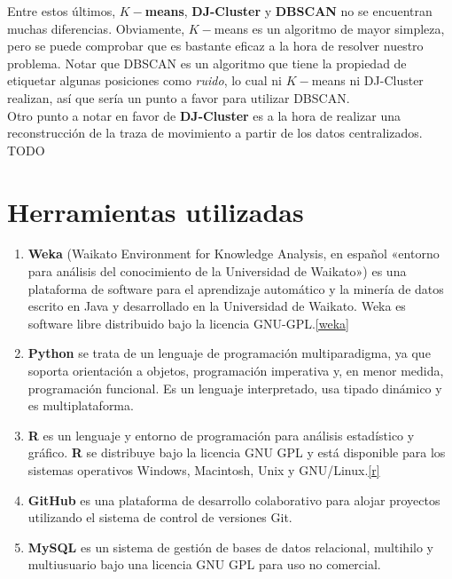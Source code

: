 \documentclass[a4paper, 12pt]{article}
\begin{document}
Entre estos \'ultimos, \textbf{$K-$means}, \textbf{DJ-Cluster} y \textbf{DBSCAN} no se encuentran muchas diferencias. Obviamente, $K-$means es un algoritmo de mayor simpleza, pero se puede comprobar que es bastante eficaz a la hora de resolver nuestro problema. Notar que DBSCAN es un algoritmo que tiene la propiedad de etiquetar algunas posiciones como \textit{ruido}, lo cual ni $K-$means ni DJ-Cluster realizan, as\'i que ser\'ia un punto a favor para utilizar DBSCAN.\\

Otro punto a notar en favor de \textbf{DJ-Cluster} es a la hora de realizar una reconstrucci\'on de la traza de movimiento a partir de los datos centralizados. TODO


\pagebreak
\section{Herramientas utilizadas}

\begin{enumerate}
	\item \textbf{Weka} (Waikato Environment for Knowledge Analysis, en espa\~nol «entorno para an\'alisis del conocimiento de la Universidad de Waikato») es una plataforma de software para el aprendizaje autom\'atico y la miner\'ia de datos escrito en Java y desarrollado en la Universidad de Waikato. Weka es software libre distribuido bajo la licencia GNU-GPL.\ref{weka}
	
	\item \textbf{Python} se trata de un lenguaje de programaci\'on multiparadigma, ya que soporta orientaci\'on a objetos, programaci\'on imperativa y, en menor medida, programaci\'on funcional. Es un lenguaje interpretado, usa tipado dinámico y es multiplataforma.
	
	\item \textbf{R} es un lenguaje y entorno de programaci\'on para an\'alisis estad\'istico y gr\'afico. \textbf{R} se distribuye bajo la licencia GNU GPL y est\'a disponible para los sistemas operativos Windows, Macintosh, Unix y GNU/Linux.\ref{r}
	
	\item \textbf{GitHub} es una plataforma de desarrollo colaborativo para alojar proyectos utilizando el sistema de control de versiones Git.
	
	\item \textbf{MySQL} es un sistema de gesti\'on de bases de datos relacional, multihilo y multiusuario bajo una licencia GNU GPL para uso no comercial.
	
\end{enumerate}
\end{document}
